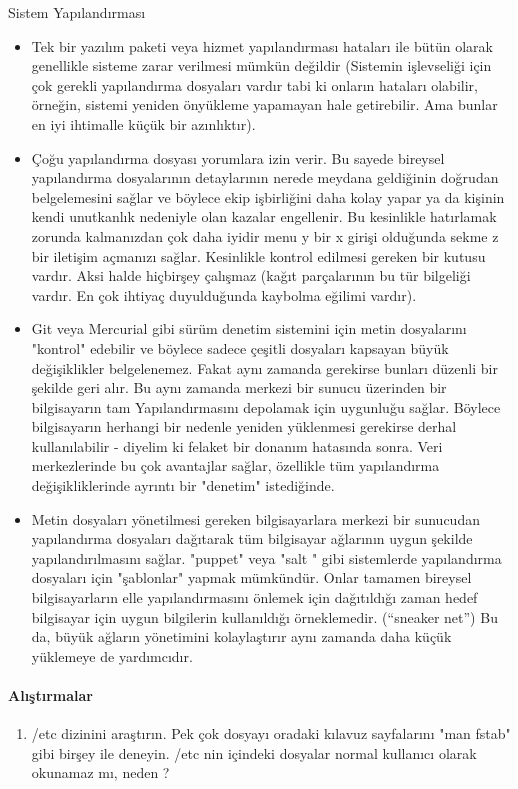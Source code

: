 \begin{section}{Sistem Yapılandırması}
\begin{itemize}
\item Tek bir yazılım paketi veya hizmet yapılandırması hataları ile bütün olarak genellikle sisteme zarar verilmesi mümkün değildir (Sistemin işlevseliği için çok gerekli yapılandırma dosyaları vardır tabi ki onların hataları olabilir, örneğin, sistemi yeniden önyükleme yapamayan hale getirebilir. Ama bunlar en iyi ihtimalle küçük bir azınlıktır).
\item Çoğu yapılandırma dosyası yorumlara izin verir. Bu sayede bireysel yapılandırma dosyalarının detaylarının nerede meydana geldiğinin doğrudan  belgelemesini sağlar ve böylece ekip işbirliğini daha kolay yapar ya da kişinin kendi unutkanlık nedeniyle olan kazalar engellenir. Bu kesinlikle hatırlamak zorunda kalmanızdan çok daha iyidir menu y bir x girişi olduğunda sekme z bir iletişim açmanızı sağlar. Kesinlikle kontrol edilmesi gereken bir kutusu vardır. Aksi halde hiçbirşey çalışmaz (kağıt parçalarının bu tür bilgeliği vardır. En çok ihtiyaç duyulduğunda kaybolma eğilimi vardır).
\item Git veya Mercurial gibi sürüm denetim sistemini için metin dosyalarını "kontrol" edebilir ve böylece sadece çeşitli dosyaları kapsayan büyük değişiklikler belgelenemez. Fakat aynı zamanda gerekirse bunları düzenli bir şekilde geri alır. Bu aynı zamanda merkezi bir sunucu üzerinden bir bilgisayarın tam Yapılandırmasını depolamak için  uygunluğu sağlar. Böylece bilgisayarın herhangi bir nedenle yeniden yüklenmesi gerekirse derhal kullanılabilir - diyelim ki felaket bir donanım hatasında sonra. Veri merkezlerinde bu  çok avantajlar sağlar, özellikle tüm yapılandırma değişikliklerinde ayrıntı bir "denetim" istediğinde.
\item Metin dosyaları yönetilmesi gereken bilgisayarlara merkezi bir sunucudan yapılandırma dosyaları dağıtarak tüm bilgisayar ağlarının uygun şekilde yapılandırılmasını sağlar. "puppet" veya "salt " gibi sistemlerde yapılandırma dosyaları için "şablonlar" yapmak mümkündür. Onlar tamamen bireysel bilgisayarların elle yapılandırmasını önlemek için dağıtıldığı zaman hedef bilgisayar için uygun bilgilerin kullanıldığı  örneklemedir. (“sneaker net”) Bu da, büyük ağların yönetimini kolaylaştırır  aynı zamanda daha küçük yüklemeye de yardımcıdır.
\end{itemize}
\paragraph{{\Huge{\PencilLeftDown}}Alıştırmalar}{
\begin{enumerate}
 \item /etc dizinini araştırın. Pek çok dosyayı oradaki kılavuz sayfalarını "man fstab" gibi birşey ile deneyin. /etc nin içindeki dosyalar normal kullanıcı olarak okunamaz mı,  neden ?
\end{enumerate}}
\end{section}
